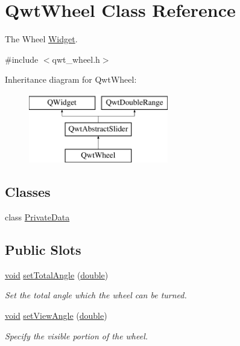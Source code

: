 \hypertarget{class_qwt_wheel}{\section{Qwt\-Wheel Class Reference}
\label{class_qwt_wheel}
}


The Wheel \hyperlink{class_widget}{Widget}.  




{\ttfamily \#include $<$qwt\-\_\-wheel.\-h$>$}

Inheritance diagram for Qwt\-Wheel\-:\begin{figure}[H]
\begin{center}
\leavevmode
\includegraphics[height=3.000000cm]{class_qwt_wheel}
\end{center}
\end{figure}
\subsection*{Classes}
\begin{DoxyCompactItemize}
\item 
class \hyperlink{class_qwt_wheel_1_1_private_data}{Private\-Data}
\end{DoxyCompactItemize}
\subsection*{Public Slots}
\begin{DoxyCompactItemize}
\item 
\hyperlink{group___u_a_v_objects_plugin_ga444cf2ff3f0ecbe028adce838d373f5c}{void} \hyperlink{class_qwt_wheel_ae4e5dfd4c6683706716681cfd7e3d8bf}{set\-Total\-Angle} (\hyperlink{_super_l_u_support_8h_a8956b2b9f49bf918deed98379d159ca7}{double})
\begin{DoxyCompactList}\small\item\em Set the total angle which the wheel can be turned. \end{DoxyCompactList}\item 
\hyperlink{group___u_a_v_objects_plugin_ga444cf2ff3f0ecbe028adce838d373f5c}{void} \hyperlink{class_qwt_wheel_a7f15b6aef98ad6b52bebc749381bc753}{set\-View\-Angle} (\hyperlink{_super_l_u_support_8h_a8956b2b9f49bf918deed98379d159ca7}{double})
\begin{DoxyCompactList}\small\item\em Specify the visible portion of the wheel. \end{DoxyCompactList}\end{DoxyCompactItemize}
